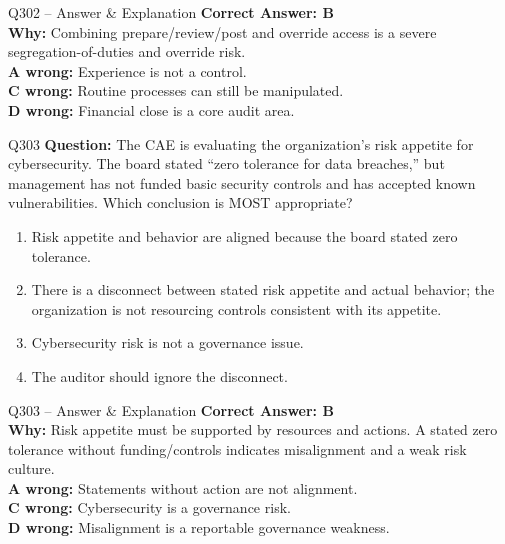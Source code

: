 \documentclass[aspectratio=169,10pt]{beamer}
\begin{document}
	\begin{frame}[t]{Q302 -- Answer \& Explanation}
		\small
		\textbf{Correct Answer: B} \\[4pt]
		\textbf{Why:} Combining prepare/review/post and override access is a severe segregation-of-duties and override risk. \\[4pt]
		\textbf{A wrong:} Experience is not a control. \\[2pt]
		\textbf{C wrong:} Routine processes can still be manipulated. \\[2pt]
		\textbf{D wrong:} Financial close is a core audit area.
	\end{frame}
	
	\begin{frame}[t]{Q303}
		\small
		\textbf{Question:} The CAE is evaluating the organization's risk appetite for cybersecurity. The board stated ``zero tolerance for data breaches,'' but management has not funded basic security controls and has accepted known vulnerabilities. Which conclusion is MOST appropriate?
		\begin{enumerate}[label=\Alph*.,itemsep=1pt,topsep=2pt]
			\item Risk appetite and behavior are aligned because the board stated zero tolerance.
			\item There is a disconnect between stated risk appetite and actual behavior; the organization is not resourcing controls consistent with its appetite.
			\item Cybersecurity risk is not a governance issue.
			\item The auditor should ignore the disconnect.
		\end{enumerate}
	\end{frame}
	
	\begin{frame}[t]{Q303 -- Answer \& Explanation}
		\small
		\textbf{Correct Answer: B} \\[4pt]
		\textbf{Why:} Risk appetite must be supported by resources and actions. A stated zero tolerance without funding/controls indicates misalignment and a weak risk culture. \\[4pt]
		\textbf{A wrong:} Statements without action are not alignment. \\[2pt]
		\textbf{C wrong:} Cybersecurity is a governance risk. \\[2pt]
		\textbf{D wrong:} Misalignment is a reportable governance weakness.
	\end{frame}
	
\end{document}
